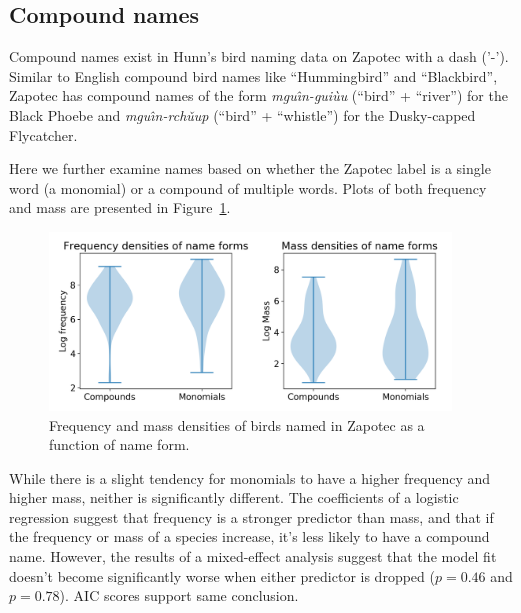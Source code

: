 \documentclass[10pt,letterpaper]{article}
\begin{document}



\subsection{Compound names}

Compound names exist in Hunn's bird naming data on Zapotec with a dash ('-'). Similar to English compound bird names like ``Hummingbird'' and ``Blackbird'', Zapotec has compound names of the form \textit{mgu\^{\i}n-gui\`{u}u} (``bird'' + ``river'') for the Black Phoebe and \textit{mgu\^{\i}n-rch\v{u}up} (``bird'' + ``whistle'') for the Dusky-capped Flycatcher.

Here we further examine names based on whether the Zapotec label is a single word (a monomial) or a compound of multiple words. Plots of both frequency and mass are presented in Figure~\ref{fig-both-nameforms}. 

\begin{figure}
  \begin{center}
    \includegraphics[width=0.95\textwidth]{./figures/nameforms-both.png}
        \caption{Frequency and mass densities of birds named in Zapotec as a function of name form.}
        \label{fig-both-nameforms}
  \end{center}
\end{figure}

While there is a slight tendency for monomials to have a higher frequency and higher mass, neither is significantly different. The coefficients of a logistic regression suggest that frequency is a stronger predictor than mass, and that if the frequency or mass of a species increase, it’s less likely to have a compound name. However, the results of a mixed-effect analysis suggest that the model fit doesn’t become significantly worse when either predictor is dropped ($p = 0.46$ and $p=0.78$). AIC scores support same conclusion.
\end{document}
